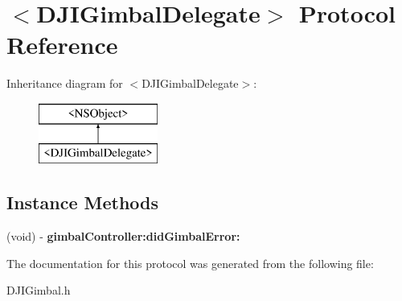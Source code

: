 \hypertarget{protocol_d_j_i_gimbal_delegate-p}{\section{$<$D\+J\+I\+Gimbal\+Delegate$>$ Protocol Reference}
\label{protocol_d_j_i_gimbal_delegate-p}
}
Inheritance diagram for $<$D\+J\+I\+Gimbal\+Delegate$>$\+:\begin{figure}[H]
\begin{center}
\leavevmode
\includegraphics[height=2.000000cm]{protocol_d_j_i_gimbal_delegate-p}
\end{center}
\end{figure}
\subsection*{Instance Methods}
\begin{DoxyCompactItemize}
\item 
\hypertarget{protocol_d_j_i_gimbal_delegate-p_ac1566e085c2f2a420df609c8805f141b}{(void) -\/ {\bfseries gimbal\+Controller\+:did\+Gimbal\+Error\+:}}\label{protocol_d_j_i_gimbal_delegate-p_ac1566e085c2f2a420df609c8805f141b}

\end{DoxyCompactItemize}


The documentation for this protocol was generated from the following file\+:\begin{DoxyCompactItemize}
\item 
D\+J\+I\+Gimbal.\+h\end{DoxyCompactItemize}
